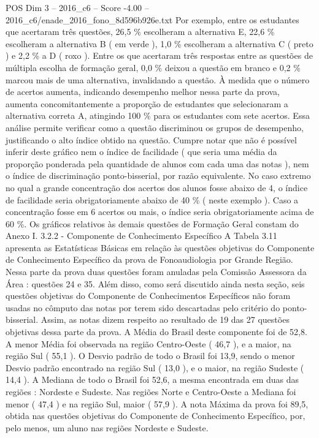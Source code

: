 \begin{textsample}{POS Dim 3 – 2016\_c6 – Score -4.00 – 2016\_c6/enade\_2016\_fono\_8d596b926e.txt}
Por exemplo, entre os estudantes que acertaram três questões, 26,5 \% escolheram a alternativa E, 22,6 \% escolheram a alternativa B ( em verde ), 1,0 \% escolheram a alternativa C ( preto ) e 2,2 \% a D ( roxo ).
Entre os que acertaram três respostas entre as questões de múltipla escolha de formação geral, 0,0 \% deixou a questão em branco e 0,2 \% marcou mais de uma alternativa, invalidando a questão.
À medida que o número de acertos aumenta, indicando desempenho melhor nessa parte da prova, aumenta concomitantemente a proporção de estudantes que selecionaram a alternativa correta A, atingindo 100 \% para os estudantes com sete acertos.
Essa análise permite verificar como a questão discriminou os grupos de desempenho, justificando o alto índice obtido na questão.
Cumpre notar que não é possível inferir deste gráfico nem o índice de facilidade ( que seria uma média da proporção ponderada pela quantidade de alunos com cada uma das notas ), nem o índice de discriminação ponto-bisserial, por razão equivalente.
No caso extremo no qual a grande concentração dos acertos dos alunos fosse abaixo de 4, o índice de facilidade seria obrigatoriamente abaixo de 40 \% ( neste exemplo ).
Caso a concentração fosse em 6 acertos ou mais, o índice seria obrigatoriamente acima de 60 \%.
Os gráficos relativos às demais questões de Formação Geral constam do Anexo I. 3.2.2 - Componente de Conhecimento Específico A Tabela 3.11 apresenta as Estatísticas Básicas em relação às questões objetivas do Componente de Conhecimento Específico da prova de Fonoaudiologia por Grande Região.
Nessa parte da prova duas questões foram anuladas pela Comissão Assessora da Área : questões 24 e 35.
Além disso, como será discutido ainda nesta seção, seis questões objetivas do Componente de Conhecimentos Específicos não foram usadas no cômputo das notas por terem sido descartadas pelo critério do ponto-bisserial.
Assim, as notas dizem respeito ao resultado de 19 das 27 questões objetivas dessa parte da prova.
A Média do Brasil deste componente foi de 52,8.
A menor Média foi observada na região Centro-Oeste ( 46,7 ), e a maior, na região Sul ( 55,1 ).
O Desvio padrão de todo o Brasil foi 13,9, sendo o menor Desvio padrão encontrado na região Sul ( 13,0 ), e o maior, na região Sudeste ( 14,4 ).
A Mediana de todo o Brasil foi 52,6, a mesma encontrada em duas das regiões : Nordeste e Sudeste.
Nas regiões Norte e Centro-Oeste a Mediana foi menor ( 47,4 ) e na região Sul, maior ( 57,9 ).
A nota Máxima da prova foi 89,5, obtida nas questões objetivas do Componente de Conhecimento Específico, por, pelo menos, um aluno nas regiões Nordeste e Sudeste.

\end{textsample}
